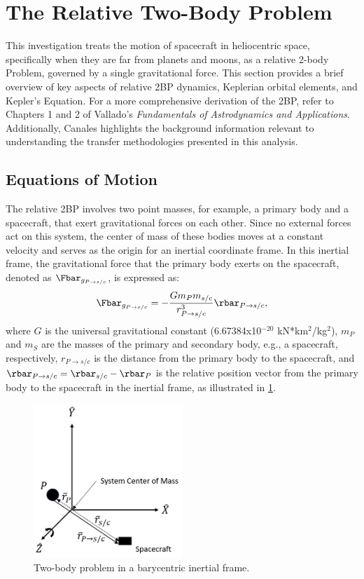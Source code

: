 \section{The Relative Two-Body Problem}
This investigation treats the motion of spacecraft in heliocentric space, specifically when they
are far from planets and moons, as a relative 2-body Problem, governed by a single gravitational
force. This section provides a brief overview of key aspects of relative 2BP dynamics, Keplerian
orbital elements, and Kepler's Equation. For a more comprehensive derivation of the 2BP, refer to
Chapters 1 and 2 of Vallado's \emph{Fundamentals of Astrodynamics and
Applications}\cite{Vallado:2013}. Additionally, Canales highlights the background information
relevant to understanding the transfer methodologies presented in this
analysis\cite{Canales:2021b}.

\subsection{Equations of Motion}
The relative 2BP involves two point masses, for example, a primary body and a spacecraft, that
exert gravitational forces on each other. Since no external forces act on this system, the center
of mass of these bodies moves at a constant velocity and serves as the origin for an inertial
coordinate frame. In this inertial frame, the gravitational force that the primary body exerts on
the spacecraft, denoted as $\Fbar_{g_{P\rightarrow s/c}}$, is expressed as:
\begin{equation}
    \Fbar_{g_{P\rightarrow s/c}}=-\frac{Gm_{P}m_{s/c}}{r_{P\rightarrow s/c}^{3}}\rbar_{P\rightarrow s/c},
    \label{eq:gravity}
\end{equation}
where $G$ is the universal gravitational constant (6.67384x10$^{-20}$ kN*km$^{2}$/kg$^{2}$),
$m_{P}$ and $m_{S}$ are the masses of the primary and secondary body, e.g., a spacecraft,
respectively, $r_{P\rightarrow s/c}$ is the distance from the primary body to the spacecraft, and
$\rbar_{P\rightarrow s/c}=\rbar_{s/c}-\rbar_{P}$ is the relative position vector from the primary
body to the spacecraft in the inertial frame, as illustrated in \cref{fig:2BP}.

\begin{figure}[H]
    \centering
    \includegraphics[width=0.5\textwidth]{figures/TBP.jpg}
    \caption{Two-body problem in a barycentric inertial frame.}
    \label{fig:2BP}
\end{figure}

